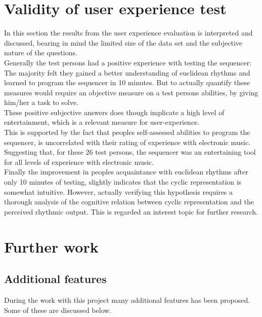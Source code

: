\section{Validity of user experience test}
In this section the results from the user experience evaluation is interpreted and discussed, bearing in mind the limited size of the data set and the subjective nature of the questions.\\
Generally the test persons had a positive experience with testing the sequencer: 
The majority felt they gained a better understanding of euclidean rhythms and learned to program the sequencer in 10 minutes. But to actually quantify these measures would require an objective measure on a test persons abilities, by giving him/her a task to solve.  \\
These positive subjective answers does though implicate a high level of entertainment, which is a relevant measure for user-experience. \\ 
This is supported by the fact that peoples self-assessed abilities to program the sequencer, is uncorrelated with their rating of experience with electronic music. Suggesting that, for these 26 test persons, the sequencer was an entertaining tool for all levels of experience with electronic music.\\
Finally the improvement in peoples acquaintance with euclidean rhythms after only 10 minutes of testing, slightly indicates that the cyclic representation is somewhat intuitive. However, actually verifying this hypothesis requires a thorough analysis of the cognitive relation between cyclic representation and the perceived rhythmic output. This is regarded an interest topic for further research. 

\section{Further work}

\subsection{Additional features}
During the work with this project many additional features has been proposed. Some of these are discussed below. \\ 


